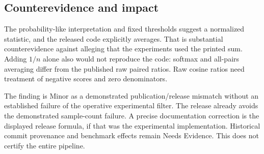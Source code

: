 \documentclass[10pt]{article}
\begin{document}
\subsection*{Counterevidence and impact}
The probability-like interpretation and fixed thresholds suggest a normalized statistic, and the released code explicitly averages. That is substantial counterevidence against alleging that the experiments used the printed sum. Adding \(1/n\) alone also would not reproduce the code: softmax and all-pairs averaging differ from the published raw paired ratios. Raw cosine ratios need treatment of negative scores and zero denominators.\par
The finding is Minor as a demonstrated publication/release mismatch without an established failure of the operative experimental filter. The release already avoids the demonstrated sample-count failure. A precise documentation correction is the displayed release formula, if that was the experimental implementation. Historical commit provenance and benchmark effects remain Needs Evidence. This does not certify the entire pipeline.\par
\end{document}
